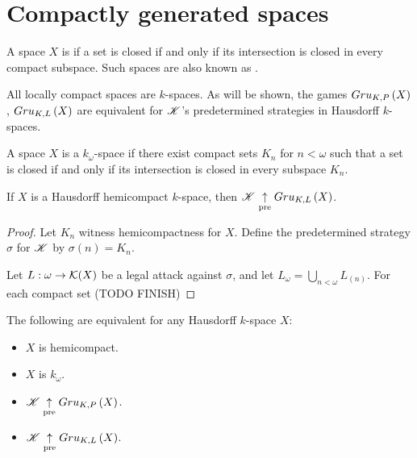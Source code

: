 \section{Compactly generated spaces}

\begin{defn}
  A space $X$ is  if a set is closed if and
  only if its intersection is closed in every compact subspace. Such
  spaces are also known as .
\end{defn}

All locally compact spaces are $k$-spaces. As will be shown,
the games $Gru_{K,P}\left({X}\right)$, $Gru_{K,L}\left({X}\right)$ are equivalent for $\mathscr{K}$'s
predetermined strategies in Hausdorff $k$-spaces.

\begin{defn}
  A space $X$ is a $k_\omega$-space if there exist compact sets $K_n$ for
  $n<\omega$ such that a set is closed if and
  only if its intersection is closed in every subspace $K_n$.
\end{defn}

\begin{thm}
  If $X$ is a Hausdorff hemicompact $k$-space, then
  $\mathscr{K} \underset{\text{pre}}{\uparrow} Gru_{K,L}\left({X}\right)$.
\end{thm}

\begin{proof}
  Let $K_n$ witness hemicompactness for $X$. Define the predetermined strategy
  $\sigma$ for $\mathscr{K}$ by $\sigma(n)=K_n$.

  Let $L:\omega\to\mathcal{K}(X)$ be a legal attack against $\sigma$, and let
  $L_\omega = \bigcup_{n<\omega}L_(n)$. For each compact set (TODO FINISH)
\end{proof}

\begin{cor}
  The following are equivalent for any Hausdorff $k$-space $X$:
    \begin{itemize}
      \item $X$ is hemicompact.
      \item $X$ is $k_{\omega}$.
      \item $\mathscr{K} \underset{\text{pre}}{\uparrow} Gru_{K,P}\left({X}\right)$.
      \item $\mathscr{K} \underset{\text{pre}}{\uparrow} Gru_{K,L}\left({X}\right)$.
    \end{itemize}
\end{cor}


